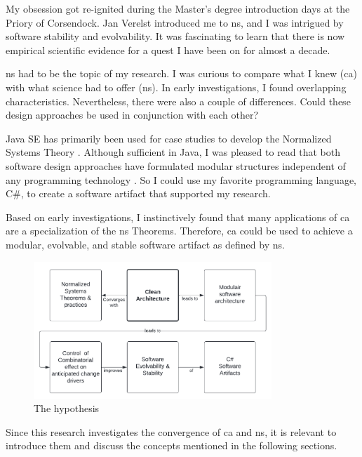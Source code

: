 My obsession got re-ignited during the Master's degree introduction days at the Priory of
Corsendock. Jan Verelst introduced me to \gls{ns}, and I was intrigued by software
stability and evolvability. It was fascinating to learn that there is now empirical
scientific evidence for a quest I have been on for almost a decade. 

\gls{ns} had to be the topic of my research. I was curious to compare what I knew
(\gls{ca}) with what science had to offer (\gls{ns}). In early investigations, I found
overlapping characteristics. Nevertheless, there were also a couple of differences. Could
these design approaches be used in conjunction with each other?

Java SE has primarily been used for case studies to develop the Normalized
Systems Theory \parencite{oorts_building_2014, de_bruyn_enabling_2018}. Although
sufficient in Java, I was pleased to read that both software design approaches have
formulated modular structures independent of any programming technology
\parencite{mannaert_normalized_2009,robert_c_martin_clean_2018}. So I could use my
favorite programming language, C\#, to create a software artifact that supported my
research. 

Based on early investigations, I instinctively found that many applications of \gls{ca}
are a specialization of the \gls{ns} Theorems. Therefore, \gls{ca} could be used to
achieve a modular, evolvable, and stable software artifact as defined by \gls{ns}.

\begin{figure}[H]
    \centering
    \includegraphics[width=0.8\textwidth]{figures/hypothesis.pdf}
    \caption[My hypothesis]{The hypothesis}
    \label{fig_hypothesis}
\end{figure}

Since this research investigates the convergence of \gls{ca} and \gls{ns}, it is relevant
to introduce them and discuss the concepts mentioned in the following sections.



